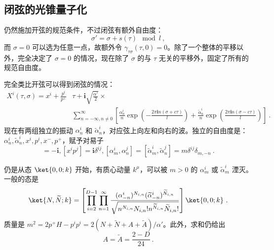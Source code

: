 

\subsection{闭弦的光锥量子化}
仍然施加开弦的规范条件，不过闭弦有额外自由度：
\begin{equation}
	\sigma' = \sigma + s(\tau) \mod l ~,
\end{equation}
而 $\sigma = 0$ 可以选为任意一点，故额外令 $\gamma_{\tau \sigma}(\tau, 0) = 0$。除了一个整体的平移以外，完全决定了 $\sigma = 0$ 的情况，现在除了 $\sigma$ 的与 $\tau$ 无关的平移外，固定了所有的规范自由度。

完全类比开弦可以得到闭弦的情况：
\begin{equation}\begin{aligned}
	X^i(\tau, \sigma) = x^i + \frac{p^i}{p^+}&\tau + \mathbf{i} \sqrt{\frac{\alpha'}{2}} \times \\
	&\sum\limits_{n = -\infty, n\neq 0}^{\infty} \left[ \frac{\alpha_n^i}{n} \exp\left(-\frac{2\pi \mathbf{i} n (\sigma + c\tau)}{l}\right) + \frac{\widetilde{\alpha}_n^i}{n} \exp\left(\frac{2\pi \mathbf{i} n (\sigma - c\tau)}{l}\right) \right] ~.
\end{aligned}\end{equation}
现在有两组独立的振动 $\alpha_n^i$ 和 $\widetilde{\alpha}_n^i$，对应弦上向左和向右的波。独立的自由度是：$\alpha_n^i, \widetilde{\alpha}_n^i, x^i, p^i, x^-, p^+$，赋予对易子 
\begin{equation}
	[x^-, p^+] = -\mathbf{i}, [x^i p^j] = \mathbf{i}\delta^{ij}, [\alpha_m^i, \alpha_n^j] = [\widetilde{\alpha}_m^i, \widetilde{\alpha}_n^j]  = m \delta^{ij} \delta_{m, -n} ~.
\end{equation}

仍是从态 $\ket{0, 0; k}$ 开始，有质心动量 $k^\mu$，可以被 $m>0$ 的 $\alpha_m^i$ 或 $\widetilde{\alpha}_m^i$ 湮灭。一般的态是 
\begin{equation}
	\ket{N, \widetilde{N}; k} = \left[\prod_{i=2}^{D-1} \prod_{n=1}^\infty \frac{(\alpha_{-n}^i)^{N_{i, n}}(\widetilde{\alpha}_{-n}^i)^{\widetilde{N}_{i, n}}}{\sqrt{n^{N_{i, n}} N_{i, n}! n^{\widetilde{N}_{i, n}} \widetilde{N}_{i, n}!}}\right] \ket{0, 0; k} ~.
\end{equation}
质量是 $m^2 = 2 p^+ H - p^i p^i = 2(N + \widetilde{N} + A + \widetilde{A})/\alpha'$。此外，求和仍给出 
\begin{equation}
	A = \widetilde{A} = \frac{2-D}{24} ~.
\end{equation}

